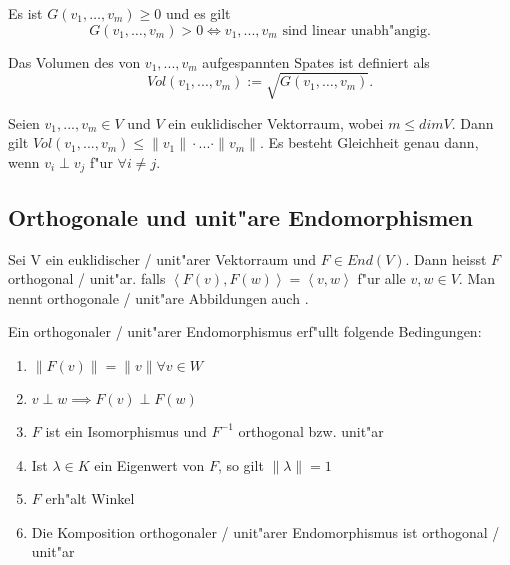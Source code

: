 \documentclass[9pt, a4paper, twocolumn, landscape]{article}
\begin{document}
\begin{remark}
Es ist $G\left(v_{1}, \ldots, v_{m}\right) \geq 0$ und es gilt
$$
G\left(v_{1}, \ldots, v_{m}\right) > 0 \Leftrightarrow v_1, ..., v_m \text{ sind linear unabh"angig.}
$$
\end{remark}

\begin{definition}
Das Volumen des von  $v_1, ..., v_m$ aufgespannten Spates ist definiert als 
$$
Vol(v_1, ..., v_m) := \sqrt{G\left(v_{1}, \ldots, v_{m}\right)}.
$$
\end{definition}

\begin{theorem}
Seien $v_1, ..., v_m \in V$ und $V$ ein euklidischer Vektorraum, wobei $m \leq dim V$. Dann gilt
$
Vol(v_1, ..., v_m) \leq \|v_1\| \cdot ... \cdot \|v_m\|.
$
Es besteht Gleichheit genau dann, wenn $v_i \perp v_j$ f"ur $\forall i \neq j$.


\end{theorem}

\subsection{Orthogonale und unit"are Endomorphismen}
\begin{definition}
Sei V ein euklidischer / unit"arer Vektorraum und $F \in End(V)$. Dann heisst $F$ orthogonal / unit"ar. falls
$
\left\langle F(v), F(w) \right\rangle = \left\langle v, w \right\rangle
$ f"ur alle $v, w \in V$. Man nennt orthogonale / unit"are Abbildungen auch .
\end{definition}

\begin{remark}
Ein orthogonaler / unit"arer Endomorphismus erf"ullt folgende Bedingungen:
\begin{enumerate}
\item $\| F(v) \| = \|v\| \forall v \in W$
\item $ v \perp w \implies F(v) \perp F(w)$
\item $F$ ist ein Isomorphismus und $F^{-1}$ orthogonal bzw. unit"ar
\item Ist $\lambda \in K$ ein Eigenwert von $F$, so gilt $\|\lambda \| = 1$\
\item $F$ erh"alt Winkel
\item Die Komposition orthogonaler / unit"arer Endomorphismus ist orthogonal / unit"ar
\end{enumerate}
\end{remark}
\end{document}
